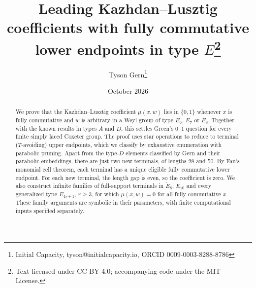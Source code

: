 \documentclass[10pt]{article}
\title{Leading Kazhdan--Lusztig coefficients with
fully commutative lower endpoints in type $E$\thanks{Text licensed under
CC BY 4.0; accompanying code under the MIT License.}}
\author{Tyson Gern\thanks{Initial Capacity, tyson@initialcapacity.io,
ORCID 0009-0003-8288-8786}}
\date{October 2026}
\theoremstyle{remark}
\begin{document}
\maketitle
\begin{abstract}
We prove that the Kazhdan--Lusztig coefficient $\mu(x,w)$ lies in
$\{0,1\}$ whenever $x$ is fully commutative
and $w$ is arbitrary in a Weyl group of type $E_6$, $E_7$ or $E_8$.
Together with the known results in types $A$ and $D$, this settles
Green's $0$--$1$ question for every finite simply laced Coxeter group.
The proof uses star operations to reduce to terminal ($T$-avoiding)
upper endpoints, which we classify by exhaustive enumeration with
parabolic pruning. Apart from the type-$D$ elements classified by Gern
and their parabolic embeddings, there are just two new terminals, of
lengths $28$ and $50$. By Fan's monomial cell theorem, each terminal has a
unique eligible fully commutative lower endpoint. For each new terminal,
the length gap is even, so the coefficient is zero. We also construct
infinite families of full-support
terminals in $\widetilde E_8$, $E_{10}$ and every generalized type
$E_{4r+1}$, $r\geq3$, for which $\mu(x,w)=0$ for all fully commutative
$x$. These family arguments are symbolic in their parameters, with
finite computational inputs specified separately.
\end{abstract}
\end{document}
